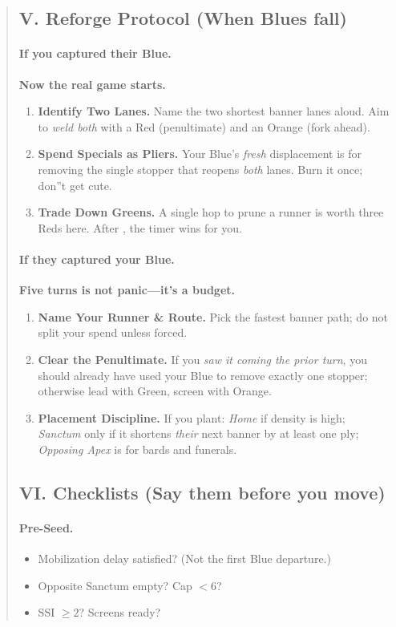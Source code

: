 \documentclass[11pt]{article}
\newcommand{\CapC}[1]{\textcolor{green!40!black}{\scriptsize\ttfamily[G:#1]}}
\begin{document}
\begin{quote}
\subsection{V. Reforge Protocol (When Blues fall)}
\paragraph{If you captured their Blue.} \textbf{Now the real game starts.}
\begin{enumerate}\itemsep0.25em
  \item \textbf{Identify Two Lanes.} Name the two shortest banner lanes aloud. Aim to \emph{weld both} with a Red (penultimate) and an Orange (fork ahead).
  \item \textbf{Spend Specials as Pliers.} Your Blue's \emph{fresh} displacement is for removing the single stopper that reopens \emph{both} lanes. Burn it once; don''t get cute.
  \item \textbf{Trade Down Greens.} A single hop to prune a runner is worth three Reds here. After \CapC{2--0}, the timer wins for you.
\end{enumerate}
\paragraph{If they captured your Blue.} \textbf{Five turns is not panic---it's a budget.}
\begin{enumerate}\itemsep0.25em
  \item \textbf{Name Your Runner \& Route.} Pick the fastest banner path; do not split your spend unless forced.
  \item \textbf{Clear the Penultimate.} If you \emph{saw it coming the prior turn}, you should already have used your Blue to remove exactly one stopper; otherwise lead with Green, screen with Orange.
  \item \textbf{Placement Discipline.} If you plant: \emph{Home} if density is high; \emph{Sanctum} only if it shortens \emph{their} next banner by at least one ply; \emph{Opposing Apex} is for bards and funerals.
\end{enumerate}

\subsection{VI. Checklists (Say them before you move)}
\paragraph{Pre-Seed.}
\begin{itemize}\itemsep0.15em
  \item Mobilization delay satisfied? (Not the first Blue departure.)
  \item Opposite Sanctum empty? Cap $<6$?
  \item SSI $\ge 2$? Screens ready?
\end{itemize}

\end{quote}
\end{document}
